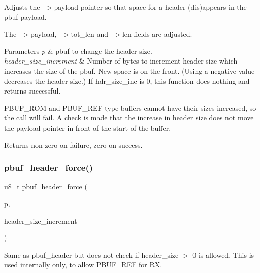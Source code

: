 Adjusts the -\/$>$payload pointer so that space for a header (dis)appears in the pbuf payload.

The -\/$>$payload, -\/$>$tot\+\_\+len and -\/$>$len fields are adjusted.


\begin{DoxyParams}{Parameters}
{\em p} & pbuf to change the header size. \\
\hline
{\em header\+\_\+size\+\_\+increment} & Number of bytes to increment header size which increases the size of the pbuf. New space is on the front. (Using a negative value decreases the header size.) If hdr\+\_\+size\+\_\+inc is 0, this function does nothing and returns successful.\\
\hline
\end{DoxyParams}
P\+B\+U\+F\+\_\+\+R\+OM and P\+B\+U\+F\+\_\+\+R\+EF type buffers cannot have their sizes increased, so the call will fail. A check is made that the increase in header size does not move the payload pointer in front of the start of the buffer. \begin{DoxyReturn}{Returns}
non-\/zero on failure, zero on success. 
\end{DoxyReturn}
\mbox{\label{openmote-cc2538_2lwip_2src_2core_2pbuf_8c_ad0e64d6fbc423593461063da97da9ce6}} 
\subsubsection{\texorpdfstring{pbuf\+\_\+header\+\_\+force()}{pbuf\_header\_force()}}
{\footnotesize\ttfamily \hyperlink{group__compiler__abstraction_ga4caecabca98b43919dd11be1c0d4cd8e}{u8\+\_\+t} pbuf\+\_\+header\+\_\+force (\begin{DoxyParamCaption}\item[{struct \hyperlink{structpbuf}{pbuf} $\ast$}]{p,  }\item[{\hyperlink{group__compiler__abstraction_gacf46f4df0ebab84edebcb69967fdf86b}{s16\+\_\+t}}]{header\+\_\+size\+\_\+increment }\end{DoxyParamCaption})}

Same as pbuf\+\_\+header but does not check if \textquotesingle{}header\+\_\+size $>$ 0\textquotesingle{} is allowed. This is used internally only, to allow P\+B\+U\+F\+\_\+\+R\+EF for RX. \mbox{\label{openmote-cc2538_2lwip_2src_2core_2pbuf_8c_a9ba3f7b705309ceadb147692fd5a1c7d}} 
